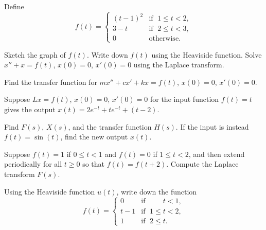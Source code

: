 \begin{exercise}
Define
\begin{equation*}
f(t) =
\begin{cases}
{(t-1)}^2 & \text{if } \; 1 \leq t < 2, \\
3-t & \text{if } \; 2 \leq t < 3, \\
0 & \text{otherwise} .
\end{cases}
\end{equation*}
\begin{tasks}
\task Sketch the graph of $f(t)$.
\task Write down $f(t)$ using the Heaviside function.
\task Solve $x''+x=f(t)$, $x(0)=0$, $x'(0) = 0$ using the Laplace transform.
\end{tasks}
\end{exercise}

\begin{exercise}
Find the transfer function for 
$m x'' + c x' + kx = f(t)$,
$x(0)=0$, $x'(0)=0$.
\end{exercise}

\begin{exercise}
Suppose $Lx = f(t)$, $x(0)=0$, $x'(0)=0$
for the input function $f(t) = t$ gives the output
$x(t) = 2e^{-t} + te^{-t} + (t-2)$.
\begin{tasks}
\task Find $F(s)$, $X(s)$, and the transfer function $H(s)$.
\task If the input is instead $f(t) = \sin(t)$, find the new output $x(t)$.
\end{tasks}
\end{exercise}

\begin{exercise}
Suppose $f(t) = 1$ if $0 \leq t < 1$ and $f(t)=0$ if $1 \leq t < 2$, and
then extend periodically for all $t \geq 0$ so that $f(t)=f(t+2)$.  Compute the
Laplace transform $F(s)$.
\end{exercise}

\setcounter{exercise}{100}

\begin{exercise}
Using the Heaviside function $u(t)$, write down the function
\begin{equation*}
f(t) =
\begin{cases}
0 & \text{if } \; \phantom{1 \leq {}} t < 1  , \\
t-1 & \text{if } \; 1 \leq t < 2 , \\
1 & \text{if } \; 2 \leq t .
\end{cases}
\end{equation*}
\end{exercise}

